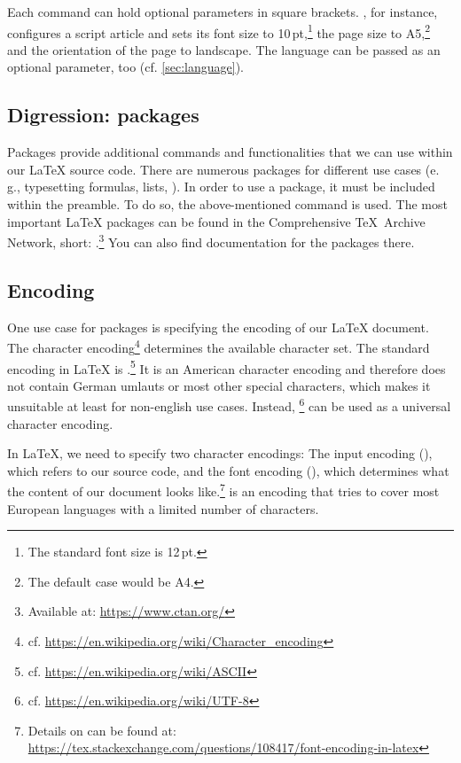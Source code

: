 Each  command can hold optional parameters in 
square brackets. 
, 
for instance, configures a  script article and sets its font size to 
10\,pt,\footnote{The standard font size is 12\,pt.} the page size to 
A5,\footnote{The default case would be A4.} and the orientation of the page to 
landscape. 
The language can be passed as an optional parameter, too (cf. \cref{sec:language}). 

\subsection{Digression: packages}
\label{sec:packages}

Packages provide additional commands and functionalities that we can use within our \LaTeX{} source code. 
There are numerous packages for different use cases (e.\,g., typesetting formulas, lists, \textellipsis). 
In order to use a package, it must be included within the preamble. 
To do so, the above-mentioned command is used. 
The most important \LaTeX{} packages can be found in the Comprehensive \TeX\ Archive Network, short: .\footnote{Available at: \url{https://www.ctan.org/}} 
You can also find documentation for the packages there. 

\subsection{Encoding}
One use case for packages is specifying the encoding of our \LaTeX{} document. 
The character encoding\footnote{cf. \url{https://en.wikipedia.org/wiki/Character_encoding}} determines the available character set.
The standard encoding in \LaTeX{} is .\footnote{cf. \url{https://en.wikipedia.org/wiki/ASCII}}
It is an American character encoding and therefore does not contain German umlauts or most other special characters, which makes it unsuitable at least for non-english use cases. 
Instead, \footnote{cf. \url{https://en.wikipedia.org/wiki/UTF-8}} can be used as a universal character encoding.

In \LaTeX{}, we need to specify two character encodings: 
The input encoding (), which refers to our source code, and the font encoding (), which determines what the content of our  document looks like.\footnote{Details on  can be found at: \url{https://tex.stackexchange.com/questions/108417/font-encoding-in-latex}}
 is an encoding that tries to cover most European languages with a limited number of characters. 

